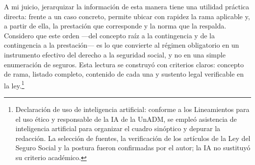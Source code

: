 \documentclass[12pt,letterpaper,oneside]{article}
\begin{document}
A mi juicio, jerarquizar la informaci\'on de esta manera tiene una utilidad pr\'actica directa: frente a un caso concreto, permite ubicar con rapidez la rama aplicable y, a partir de ella, la prestaci\'on que corresponde y la norma que la respalda. Considero que este orden ---del concepto ra\'iz a la contingencia y de la contingencia a la prestaci\'on--- es lo que convierte al r\'egimen obligatorio en un instrumento efectivo del derecho a la seguridad social, y no en una simple enumeraci\'on de seguros. Esta lectura se construy\'o con criterios claros: concepto de rama, listado completo, contenido de cada una y sustento legal verificable en la ley.\footnote{Declaraci\'on de uso de inteligencia artificial: conforme a los Lineamientos para el uso \'etico y responsable de la IA de la UnADM, se emple\'o asistencia de inteligencia artificial para organizar el cuadro sin\'optico y depurar la redacci\'on. La selecci\'on de fuentes, la verificaci\'on de los art\'iculos de la Ley del Seguro Social y la postura fueron confirmadas por el autor; la IA no sustituy\'o su criterio acad\'emico.}

\clearpage
\nocite{lss2026,bricenoRuiz2011,ramirezChavero2009,herreraMontes2024,stpsGuiaPrevisional,cpeum2026}

\end{document}
